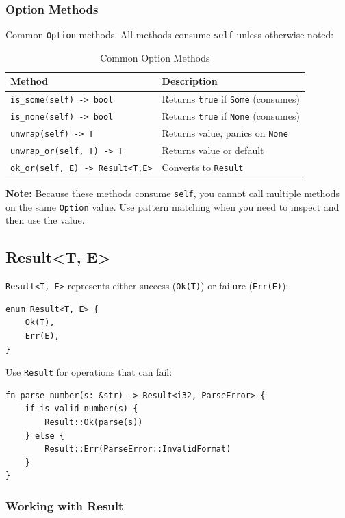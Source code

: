 \subsubsection{Option Methods}

Common \texttt{Option} methods. All methods consume \texttt{self} unless otherwise noted:

\begin{table}[h]
\centering
\begin{tabular}{lp{8cm}}
\hline
\textbf{Method} & \textbf{Description} \\
\hline
\texttt{is\_some(self) -> bool} & Returns \texttt{true} if \texttt{Some} (consumes) \\
\texttt{is\_none(self) -> bool} & Returns \texttt{true} if \texttt{None} (consumes) \\
\texttt{unwrap(self) -> T} & Returns value, panics on \texttt{None} \\
\texttt{unwrap\_or(self, T) -> T} & Returns value or default \\
\texttt{ok\_or(self, E) -> Result<T,E>} & Converts to \texttt{Result} \\
\hline
\end{tabular}
\caption{Common Option Methods}
\end{table}

\textbf{Note:} Because these methods consume \texttt{self}, you cannot call multiple methods on the same \texttt{Option} value. Use pattern matching when you need to inspect and then use the value.

\subsection{Result<T, E>}

\texttt{Result<T, E>} represents either success (\texttt{Ok(T)}) or failure (\texttt{Err(E)}):

\begin{lstlisting}
enum Result<T, E> {
    Ok(T),
    Err(E),
}
\end{lstlisting}

Use \texttt{Result} for operations that can fail:

\begin{lstlisting}
fn parse_number(s: &str) -> Result<i32, ParseError> {
    if is_valid_number(s) {
        Result::Ok(parse(s))
    } else {
        Result::Err(ParseError::InvalidFormat)
    }
}
\end{lstlisting}

\subsubsection{Working with Result}

